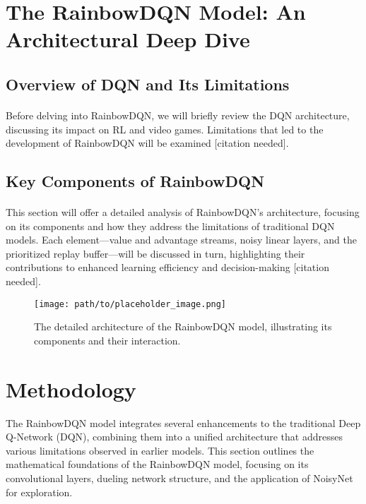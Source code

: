\documentclass[12pt,a4paper]{article}
\begin{document}
\section{The RainbowDQN Model: An Architectural Deep Dive}
\subsection{Overview of DQN and Its Limitations}
\paragraph{}
Before delving into RainbowDQN, we will briefly review the DQN architecture, discussing its impact on RL and video games. Limitations that led to the development of RainbowDQN will be examined [citation needed].

\subsection{Key Components of RainbowDQN}
\paragraph{}
This section will offer a detailed analysis of RainbowDQN's architecture, focusing on its components and how they address the limitations of traditional DQN models. Each element—value and advantage streams, noisy linear layers, and the prioritized replay buffer—will be discussed in turn, highlighting their contributions to enhanced learning efficiency and decision-making [citation needed].

\begin{figure}[ht]
\centering
\texttt{[image: path/to/placeholder\_image.png]}
\caption{The detailed architecture of the RainbowDQN model, illustrating its components and their interaction.}
\label{fig:rainbowdqn_architecture}
\end{figure}

\section{Methodology}

The RainbowDQN model integrates several enhancements to the traditional Deep Q-Network (DQN), combining them into a unified architecture that addresses various limitations observed in earlier models. This section outlines the mathematical foundations of the RainbowDQN model, focusing on its convolutional layers, dueling network structure, and the application of NoisyNet for exploration.
\end{document}
